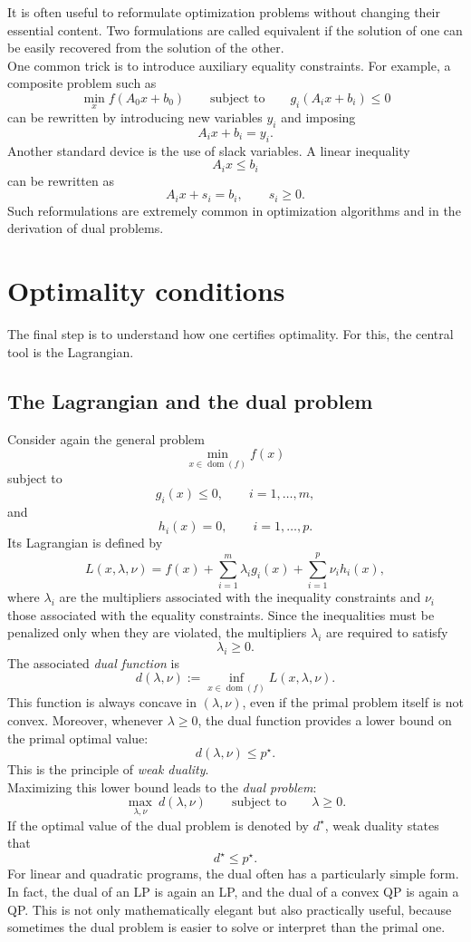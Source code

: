 It is often useful to reformulate optimization problems without changing their essential content. Two formulations are called equivalent if the solution of one can be easily recovered from the solution of the other.\\

One common trick is to introduce auxiliary equality constraints. For example, a composite problem such as
\[
\min_x f(A_0x+b_0)
\qquad\text{subject to}\qquad
g_i(A_ix+b_i)\le 0
\]
can be rewritten by introducing new variables \(y_i\) and imposing
\[
A_i x + b_i = y_i.
\]
Another standard device is the use of slack variables. A linear inequality
\[
A_i x \le b_i
\]
can be rewritten as
\[
A_i x + s_i = b_i,\qquad s_i\ge 0.
\]
Such reformulations are extremely common in optimization algorithms and in the derivation of dual problems.

\section{Optimality conditions}

The final step is to understand how one certifies optimality. For this, the central tool is the Lagrangian.

\subsection{The Lagrangian and the dual problem}

Consider again the general problem
\[
\min_{x\in\operatorname{dom}(f)} f(x)
\]
subject to
\[
g_i(x)\le 0,\qquad i=1,\dots,m,
\]
and
\[
h_i(x)=0,\qquad i=1,\dots,p.
\]
Its Lagrangian is defined by
\[
L(x,\lambda,\nu)
=
f(x)
+
\sum_{i=1}^m \lambda_i g_i(x)
+
\sum_{i=1}^p \nu_i h_i(x),
\]
where \(\lambda_i\) are the multipliers associated with the inequality constraints and \(\nu_i\) those associated with the equality constraints. Since the inequalities must be penalized only when they are violated, the multipliers \(\lambda_i\) are required to satisfy
\[
\lambda_i \ge 0.
\]
The associated \emph{dual function} is
\[
d(\lambda,\nu)
:=
\inf_{x\in\operatorname{dom}(f)} L(x,\lambda,\nu).
\]
This function is always concave in \((\lambda,\nu)\), even if the primal problem itself is not convex. Moreover, whenever \(\lambda\ge 0\), the dual function provides a lower bound on the primal optimal value:
\[
d(\lambda,\nu)\le p^\star.
\]
This is the principle of \emph{weak duality}.\\
Maximizing this lower bound leads to the \emph{dual problem}:
\[
\max_{\lambda,\nu}\ d(\lambda,\nu)
\qquad\text{subject to}\qquad
\lambda\ge 0.
\]
If the optimal value of the dual problem is denoted by \(d^\star\), weak duality states that
\[
d^\star \le p^\star.
\]
For linear and quadratic programs, the dual often has a particularly simple form. In fact, the dual of an LP is again an LP, and the dual of a convex QP is again a QP. This is not only mathematically elegant but also practically useful, because sometimes the dual problem is easier to solve or interpret than the primal one.

